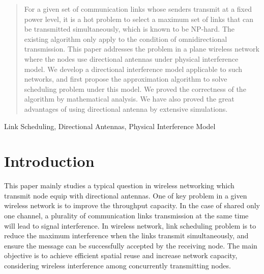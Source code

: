 \documentclass[conference]{IEEEtran}
\begin{document}
\begin{abstract}
For a given set of communication links whose senders transmit at a fixed power level, it is a hot problem to select a maximum set of links that can be transmitted simultaneously, which is known to be NP-hard. The existing algorithm only apply to the condition of omnidirectional transmission. This paper addresses the problem in a plane wireless network where the nodes use directional antennas under physical interference model. We develop a directional interference model applicable to such networks, and first propose the approximation algorithm to solve scheduling problem under this model. We proved the correctness of the algorithm by mathematical analysis. We have also proved the great advantages of using directional antenna by extensive simulations.
\end{abstract}


\begin{IEEEkeywords}
Link Scheduling, Directional Antennas, Physical Interference Model
\end{IEEEkeywords}


%
\IEEEpeerreviewmaketitle



\section{Introduction}
This paper mainly studies a typical question in wireless networking which transmit node equip with directional antennas. One of key problem in a given wireless network is to improve the throughput capacity. In the case of shared only one channel, a plurality of communication links transmission at the same time will lead to signal interference. In wireless network, link scheduling problem is to reduce the maximum interference when the links transmit simultaneously, and ensure the message can be successfully accepted by the receiving node. The main objective is to achieve efficient spatial reuse and increase network capacity, considering wireless interference among concurrently transmitting nodes.
\end{document}
